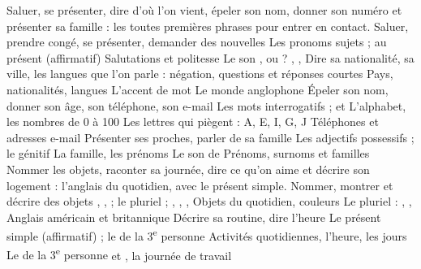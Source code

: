   {Saluer, se présenter, dire d'où l'on vient, épeler son nom, donner son numéro et présenter
   sa famille : les toutes premières phrases pour entrer en contact.}
  {Saluer, prendre congé, se présenter, demander des nouvelles}
  {Les pronoms sujets ;  au présent (affirmatif)}
  {Salutations et politesse}
  {Le son }
  {,  ou  ? , , }
  {Dire sa nationalité, sa ville, les langues que l'on parle}
  { : négation, questions et réponses courtes}
  {Pays, nationalités, langues}
  {L'accent de mot}
  {Le monde anglophone}
  {Épeler son nom, donner son âge, son téléphone, son e-mail}
  {Les mots interrogatifs ;  et }
  {L'alphabet, les nombres de 0 à 100}
  {Les lettres qui piègent : A, E, I, G, J}
  {Téléphones et adresses e-mail}
  {Présenter ses proches, parler de sa famille}
  {Les adjectifs possessifs ; le génitif }
  {La famille, les prénoms}
  {Le son  de }
  {Prénoms, surnoms et familles}
  {Nommer les objets, raconter sa journée, dire ce qu'on aime et décrire son logement :
   l'anglais du quotidien, avec le présent simple.}
  {Nommer, montrer et décrire des objets}
  {, ,  ; le pluriel ; , , , }
  {Objets du quotidien, couleurs}
  {Le pluriel : , , }
  {Anglais américain et britannique}
  {Décrire sa routine, dire l'heure}
  {Le présent simple (affirmatif) ; le  de la 3\textsuperscript{e} personne}
  {Activités quotidiennes, l'heure, les jours}
  {Le  de la 3\textsuperscript{e} personne}
  { et , la journée de travail}
